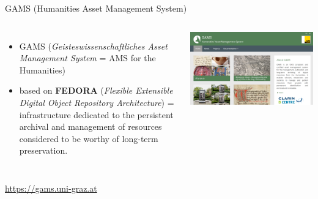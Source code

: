 \begin{frame}[allowframebreaks]{GAMS (Humanities Asset Management System)}
    \begin{columns}
    \begin{itemize}\small
        \item GAMS (\emph{Geisteswissenschaftliches Asset Management System} = AMS for the Humanities)
        \item based on \textbf{FEDORA} (\emph{Flexible Extensible Digital Object Repository Architecture}) = infrastructure dedicated to the persistent archival and management of resources considered to be worthy of long-term preservation.
    \end{itemize}
    \includegraphics[width=\textwidth]{img/gams.png}
    \end{columns}
    \bigskip 
    
    \protect\url{https://gams.uni-graz.at}
    
    \framebreak
    

\end{frame}

